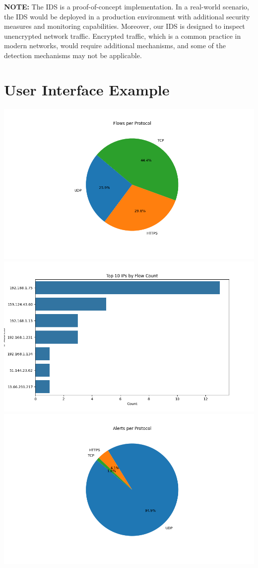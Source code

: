 \documentclass{article}
\begin{document}
\textbf{NOTE:} The IDS is a proof-of-concept implementation. In a real-world scenario, the IDS would be deployed in a production environment with additional security measures and monitoring capabilities. Moreover, our IDS is designed to inspect unencrypted network traffic. Encrypted traffic, which is a common practice in modern networks, would require additional mechanisms, and some of the detection mechanisms may not be applicable.

\appendix

\section{User Interface Example}
\label{sec:ui}
\includegraphics[width=\textwidth]{Screenshots/Flows_per_Protocol.png}
\includegraphics[width=\textwidth]{Screenshots/Top_10_IPs_by_Flow_Count.png}
\includegraphics[width=\textwidth]{Screenshots/Alerts_per_Protocol.png}
\end{document}

